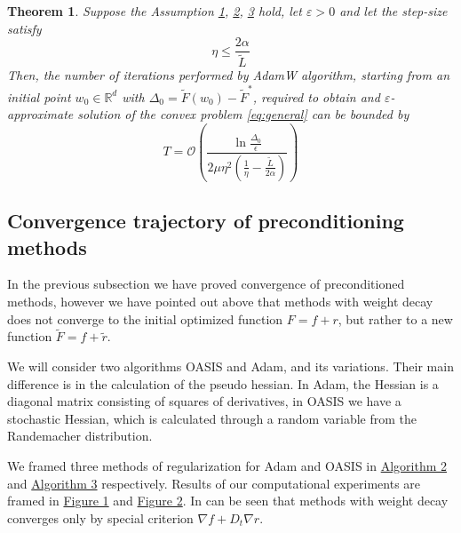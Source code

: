 \documentclass{article}
\newtheorem{theorem}{Theorem}
\begin{document}
\begin{theorem}
    Suppose the Assumption \hyperref[ass:convex]{1}, \hyperref[ass:Lsmoothness]{2}, \hyperref[ass:plcondition]{3} hold, let $\varepsilon > 0$ and let the step-size satisfy
    \begin{equation*}
        \eta \leq \frac{2 \alpha}{\tilde{L}}
    \end{equation*}
    Then, the number of iterations performed by AdamW algorithm, starting from an initial point $w_0 \in \mathbb{R}^d$ with $\Delta_0 = \tilde{F}(w_0) - \tilde{F}^*$, required to obtain and $\varepsilon$-approximate solution of the convex problem \eqref{eq:general} can be bounded by
    \begin{equation*}
        T =  \mathcal{O}\left( \frac{\ln \frac{\Delta_0}{\epsilon}}{2 \mu \eta^2(\frac{1}{\eta} - \frac{\tilde{L}}{2 \alpha})} \right)
    \end{equation*}
    \label{theor:2}
\end{theorem}


\subsection{Convergence trajectory of preconditioning methods}

 In the previous subsection we have proved convergence of preconditioned methods, however we have pointed out above that methods with weight decay does not converge to the initial optimized function $F = f + r$, but rather to a new function $\tilde{F} = f + \tilde{r}$.

We will consider two algorithms OASIS and Adam, and its variations. Their main difference is in the calculation of the pseudo hessian.
In Adam, the Hessian is a diagonal matrix consisting of squares of derivatives, in OASIS we have a stochastic Hessian, which is calculated through a random variable from the Randemacher distribution. 

We framed three methods of regularization for Adam and OASIS in \hyperref[alg:genAdam]{Algorithm 2} and \hyperref[alg:OASIS]{Algorithm 3} respectively.
Results of our computational experiments are framed in \hyperref[fig:adams_error]{Figure 1} and \hyperref[fig:oasis_error]{Figure 2}.
In can be seen that methods with weight decay converges only by special criterion $\nabla f + D_t \nabla r$.
\end{document}
